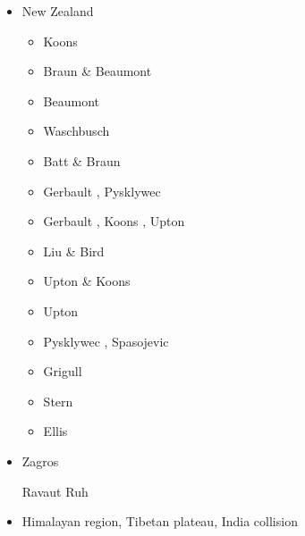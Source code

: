 \begin{itemize}
\item {New Zealand} 

\begin{scriptsize}
\begin{itemize}
\item[\nineteenninety] Koons \cite{koon90}
\item[\nineteenninetyfive] Braun \& Beaumont \cite{brbe95}
\item[\nineteenninetysix] Beaumont \etal \cite{bekh96}
\item[\nineteenninetyeight] Waschbusch \etal \cite{wabb98}
\item[\nineteenninetynine] Batt \& Braun \cite{babr99}
\item[\twothousandtwo] Gerbault \etal \cite{gedh02}, Pysklywec \etal \cite{pybf02}
\item[\twothousandthree] Gerbault \etal \cite{gehd03}, Koons \etal \cite{konc03}, Upton \etal \cite{upke03}
\item[\twothousandsix] Liu \& Bird \cite{libi06}
\item[\twothousandseven] Upton \& Koons \cite{upko07}
\item[\twothousandnine] Upton \etal \cite{upkc09}
\item[\twothousandten] Pysklywec \etal \cite{pyeg10}, Spasojevic \etal \cite{spgs10a}
\item[\twothousandtwelve] Grigull \etal \cite{grel12}
\item[\twothousandthirteen] Stern \etal \cite{sths13}
\item[\twothousandsixteen] Ellis \etal \cite{elwr16}
\end{itemize}
\end{scriptsize}

\item {Zagros} 

\begin{scriptsize}
Ravaut \etal \cite{rabh97}
\cite{vech06}
\cite{hamo10}
\cite{yakm11}
\cite{nipc13}
\cite{frba14}
\cite{ghbu14}
\cite{coyc16}
Ruh \etal \cite{rugb17}
\end{scriptsize}

\item {Himalayan region, Tibetan plateau, India collision} 


\end{itemize}
